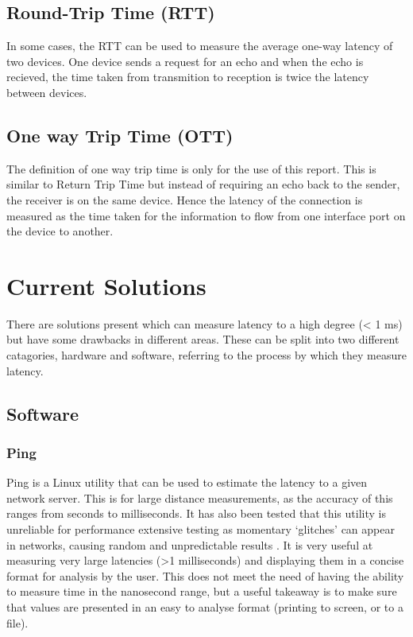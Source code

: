 \subsection{Round-Trip Time (RTT)}

In some cases, the RTT can be used to measure the average one-way latency of two devices. One
device sends a request for an echo and when the echo is recieved, the time taken from transmition to reception is
twice the latency between devices.

\subsection{One way Trip Time (OTT)}

The definition of one way trip time is only for the use of this report. This is similar to Return Trip Time but 
instead of requiring an echo back to the sender, the receiver is on the same device. Hence the latency of the 
connection is measured as the time taken for the information to flow from one interface port on the device to another.

\section{Current Solutions}

There are solutions present which can measure latency to a high degree (< 1 ms) but have some drawbacks in different 
areas. These can be split into two different catagories, hardware and software, referring to the process by which 
they measure latency.

\subsection{Software}

\subsubsection{Ping}

Ping is a Linux utility that can be used to estimate the latency to a given network server. 
This is for large distance measurements, as the accuracy of this ranges from seconds to milliseconds. 
It has also been tested that this utility is unreliable for performance extensive testing as momentary ‘glitches’ 
can appear in networks, causing random and unpredictable results \cite{pingisbad}.
It is very useful at measuring very large latencies (>1 milliseconds) and displaying them in a concise format 
for analysis by the user. 
This does not meet the need of having the ability to measure time in the nanosecond range, but a useful takeaway 
is to make sure that values are presented in an easy to analyse format (printing to screen, or to a file).


